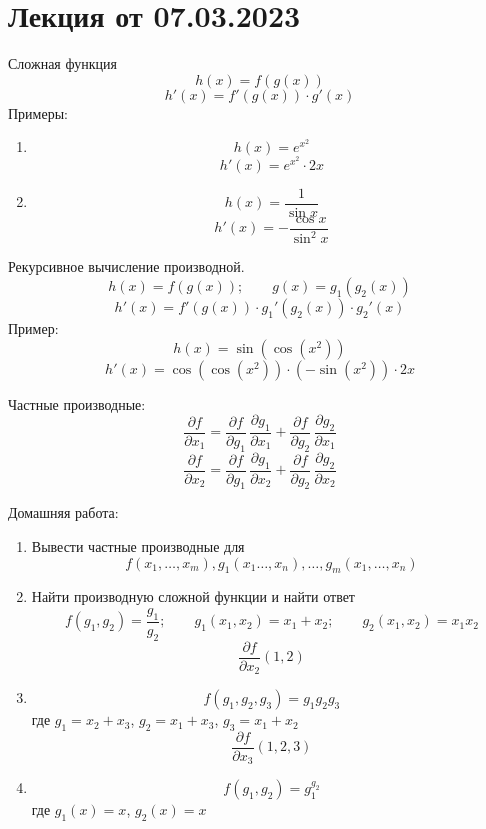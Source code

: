 
\section{Лекция от 07.03.2023}
Сложная функция
\[
  h(x) = f(g(x))
\] 
\[
  h'(x) = f'(g(x)) \cdot g'(x)
\] 
Примеры:
\begin{enumerate}
  \item 
    \[
      h(x) = e^{x^{2}}
    \] 
    \[
      h'(x) = e^{x^{2}} \cdot 2x
    \] 
  \item 
    \[
      h(x) = \frac{1}{\sin x}
    \] 
    \[
      h'(x) = - \frac{\cos x}{\sin^2 x}
    \] 
\end{enumerate}

Рекурсивное вычисление производной.
\[
  h(x) = f(g(x)); \qquad g(x) = g_1(g_2(x))
\] 
\[
  h'(x) = f'(g(x)) \cdot g_1'(g_2(x)) \cdot g_2'(x)
\] 
Пример:
\[
  h(x) = \sin(\cos(x^2))
\] 
\[
  h'(x) = \cos(\cos(x^2)) \cdot  (-\sin(x^2)) \cdot 2x 
\] 

Частные производные:
\[
  \frac{\partial f}{\partial x_1} = \frac{\partial f}{\partial g_1} \, 
  \frac{\partial g_1}{\partial x_1} + \frac{\partial f}{\partial g_2} \, 
  \frac{\partial g_2}{\partial x_1} 
\] 
\[
  \frac{\partial f}{\partial x_2} = \frac{\partial f}{\partial g_1} \, 
  \frac{\partial g_1}{\partial x_2} + \frac{\partial f}{\partial g_2} \, 
  \frac{\partial g_2}{\partial x_2} 
\] 

Домашняя работа:
\begin{enumerate}
  \item Вывести частные производные для
    \[
      f(x_1, \ldots, x_m), g_1(x_1 \ldots, x_n), \ldots, g_m(x_1, \ldots, x_n)
    \] 
  \item Найти производную сложной функции и найти ответ
    \[
      f(g_1, g_2) = \frac{g_1}{g_2}; \qquad g_1(x_1, x_2) = x_1 + x_2; \qquad 
      g_2(x_1, x_2) = x_1 x_2
    \] 
    \[
      \frac{\partial f}{\partial x_2} (1, 2)
    \] 
  \item 
    \[
      f(g_1, g_2, g_3) = g_1 g_2 g_3
    \] 
    где $g_1 = x_2 + x_3$, $g_2 = x_1 + x_3$, $g_3 = x_1 + x_2$
    \[
      \frac{\partial f}{\partial x_3} (1, 2, 3)
    \]
  \item 
    \[
      f(g_1, g_2) = g_1^{g_2}
    \] 
    где $g_1(x) = x$, $g_2(x) = x$
\end{enumerate}
